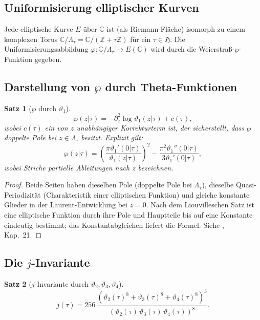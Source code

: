 \documentclass[12pt,a4paper]{amsart}
\newtheorem{theorem}{Satz}[section]
\theoremstyle{definition}
\begin{document}
\subsection{Uniformisierung elliptischer Kurven}

Jede elliptische Kurve $E$ über $\mathbb{C}$ ist (als Riemann-Fläche) isomorph zu einem
komplexen Torus $\mathbb{C}/\Lambda_\tau = \mathbb{C}/(\mathbb{Z} + \tau\mathbb{Z})$
für ein $\tau \in \mathfrak{H}$.
Die Uniformisierungsabbildung
$\varphi: \mathbb{C}/\Lambda_\tau \to E(\mathbb{C})$
wird durch die Weierstraß-$\wp$-Funktion gegeben.

\subsection{Darstellung von $\wp$ durch Theta-Funktionen}

\begin{theorem}[$\wp$ durch $\vartheta_1$]\label{thm:wp_theta}
\[
  \wp(z|\tau)
  = -\partial_z^2 \log\vartheta_1(z|\tau)
    + c(\tau),
\]
wobei $c(\tau)$ ein von $z$ unabhängiger Korrekturterm ist, der sicherstellt,
dass $\wp$ doppelte Pole bei $z \in \Lambda_\tau$ besitzt.
Explizit gilt:
\[
  \wp(z|\tau) = \left(\frac{\pi\vartheta_1'(0|\tau)}{\vartheta_1(z|\tau)}\right)^2
  - \frac{\pi^2\vartheta_1''(0|\tau)}{3\vartheta_1'(0|\tau)},
\]
wobei Striche partielle Ableitungen nach $z$ bezeichnen.
\end{theorem}

\begin{proof}
Beide Seiten haben dieselben Pole (doppelte Pole bei $\Lambda_\tau$),
dieselbe Quasi-Periodizität (Charakteristik einer elliptischen Funktion)
und gleiche konstante Glieder in der Laurent-Entwicklung bei $z=0$.
Nach dem Liouvilleschen Satz ist eine elliptische Funktion durch ihre Pole und
Hauptteile bis auf eine Konstante eindeutig bestimmt; das Konstantabgleichen
liefert die Formel. Siehe \cite{WhittakerWatson1927}, Kap.~21.
\end{proof}

\subsection{Die $j$-Invariante}

\begin{theorem}[$j$-Invariante durch $\vartheta_2, \vartheta_3, \vartheta_4$]
\[
  j(\tau)
  = 256\,\frac{(\vartheta_2(\tau)^8 + \vartheta_3(\tau)^8 + \vartheta_4(\tau)^8)^3}
              {(\vartheta_2(\tau)\,\vartheta_3(\tau)\,\vartheta_4(\tau))^8}.
\]
\end{theorem}
\end{document}
